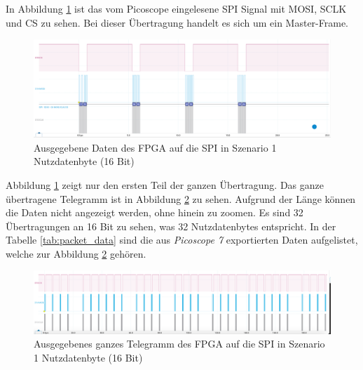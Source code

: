 In Abbildung \ref{fig:ResultatFPGANoBuff} ist das vom Picoscope eingelesene SPI Signal mit MOSI, SCLK und CS zu sehen. Bei dieser Übertragung handelt es sich um ein Master-Frame.


\begin{figure}[H]
    \centering
    \includegraphics[width=1\linewidth]{Figures/Chap4/FPGA/Test_FPGA_noBuff_signal.png}
    \caption{Ausgegebene Daten des FPGA auf die SPI in Szenario 1 Nutzdatenbyte (16 Bit)}
    \label{fig:ResultatFPGANoBuff}
\end{figure}

Abbildung \ref{fig:ResultatFPGANoBuff} zeigt nur den ersten Teil der ganzen Übertragung. Das ganze übertragene Telegramm ist in Abbildung \ref{fig:ResultatFPGANoBuffFull} zu sehen. Aufgrund der Länge können die Daten nicht angezeigt werden, ohne hinein zu zoomen.
Es sind 32 Übertragungen an 16 Bit zu sehen, was 32 Nutzdatenbytes entspricht. In der Tabelle \ref{tab:packet_data} sind die aus \textit{Picoscope 7} exportierten Daten aufgelistet, welche zur Abbildung \ref{fig:ResultatFPGANoBuffFull} gehören.

\begin{figure}[H]
    \centering
    \includegraphics[width=1\linewidth]{Figures/Chap4/FPGA/Test_FPGA_noBuff_signal_full.png}
    \caption{Ausgegebenes ganzes Telegramm des FPGA auf die SPI in Szenario 1 Nutzdatenbyte (16 Bit)}
    \label{fig:ResultatFPGANoBuffFull}
\end{figure}

